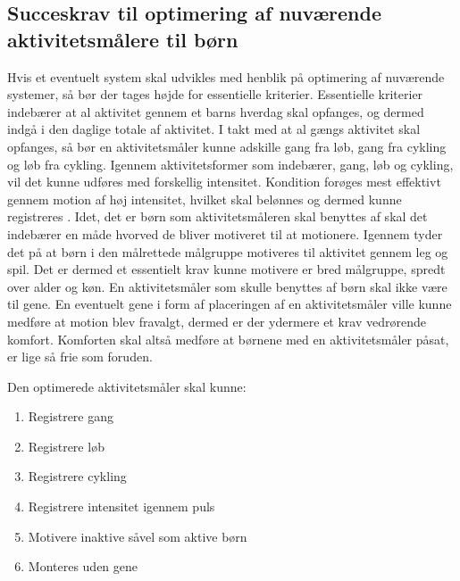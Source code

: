 \subsection{Succeskrav til optimering af nuværende aktivitetsmålere til børn}
Hvis et eventuelt system skal udvikles med henblik på optimering af nuværende systemer, så bør der tages højde for essentielle kriterier. Essentielle kriterier indebærer at al aktivitet gennem et barns hverdag skal opfanges, og dermed indgå i den daglige totale af aktivitet. I takt med at al gængs aktivitet skal opfanges, så bør en aktivitetsmåler kunne adskille gang fra løb, gang fra cykling og løb fra cykling. Igennem aktivitetsformer som indebærer, gang, løb og cykling, vil det kunne udføres med forskellig intensitet. Kondition forøges mest effektivt gennem motion af høj intensitet, hvilket skal belønnes og dermed kunne registreres \citep{Hjerteforeningen}. Idet, det er børn som aktivitetsmåleren skal benyttes af skal det indebærer en måde hvorved de bliver motiveret til at motionere. Igennem  tyder det på at børn i den målrettede målgruppe motiveres til aktivitet gennem leg og spil. Det er dermed et essentielt krav kunne motivere er bred målgruppe, spredt over alder og køn. En aktivitetsmåler som skulle benyttes af børn skal ikke være til gene. En eventuelt gene i form af placeringen af en aktivitetsmåler ville kunne medføre at motion blev fravalgt, dermed er der ydermere et krav vedrørende komfort. Komforten skal altså medføre at børnene med en aktivitetsmåler påsat, er lige så frie som foruden.

Den optimerede aktivitetsmåler skal kunne: 
\begin{enumerate}
\item Registrere gang
\item Registrere løb
\item Registrere cykling
\item Registrere intensitet igennem puls
\item Motivere inaktive såvel som aktive børn
\item Monteres uden gene
\end{enumerate}
